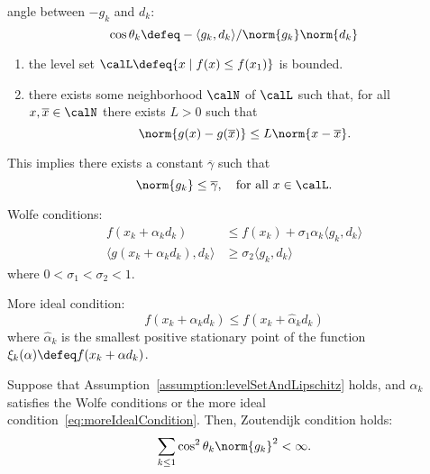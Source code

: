 \documentclass[\main/main]{subfiles}
\begin{document}
angle between $-g_k$ and $d_k$:
\begin{equation}
    \cos \theta_k \defeq - \langle g_k, d_k \rangle / \norm{g_k} \norm{d_k}
\end{equation}

\begin{assumption}\label{assumption:levelSetAndLipschitz}
    \begin{enumerate}
        \item the level set $\calL \defeq \{ x \mid f(x) \leq f(x_1) \}$ is bounded.
        \item there exists some neighborhood $\calN$ of $\calL$ such that,
              for all $x, \overline{x} \in \calN$ there exists $L > 0$ such that
              \begin{equation}
                  \norm{g(x) - g(\overline{x})} \leq L \norm{x - \overline{x}}.
              \end{equation}
    \end{enumerate}
\end{assumption}

This implies there exists a constant $\overline{\gamma}$ such that
\begin{equation}
    \norm{g_k} \leq \overline{\gamma}, \quad \text{for all } x \in \calL.
\end{equation}

Wolfe conditions:
\begin{align}
    f(x_k + \alpha_k d_k)                      & \leq f(x_k) + \sigma_1 \alpha_k \langle g_k, d_k \rangle \\
    \langle g(x_k + \alpha_k d_k), d_k \rangle & \geq \sigma_2 \langle g_k, d_k \rangle
\end{align}
where $0 < \sigma_1 < \sigma_2 < 1$.

More ideal condition:
\begin{equation}\label{eq:moreIdealCondition}
    f(x_k + \alpha_k d_k) \leq f(x_k + \hat{\alpha}_k d_k)
\end{equation}
where $\hat{\alpha}_k$ is the smallest positive stationary point of the function $\xi_k(\alpha) \defeq f(x_k + \alpha d_k)$.

\begin{theorem}
    Suppose that Assumption~\ref{assumption:levelSetAndLipschitz} holds, and $\alpha_k$ satisfies the Wolfe conditions or the more ideal condition~\eqref{eq:moreIdealCondition}.
    Then, Zoutendijk condition holds:
    \begin{equation}
        \sum_{k \leq 1} \cos^2 \theta_k \norm{g_k}^2 < \infty.
    \end{equation}
\end{theorem}
\end{document}
